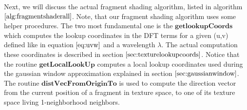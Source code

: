 \label{sec:proceduresdescripton}
Next, we will discuss the actual fragment shading algorithm, listed in algorithm $\ref{alg:fragmentshaderall}$. Note, that our fragment shading algorithm uses some helper procedures. The two most fundamental one is the $\textbf{getlookupCoords}$ which computes the lookup coordinates in the DFT terms for a given (u,v) defined like in equation $\ref{eq:uvw}$ and a wavelength $\lambda$. The actual computation these coordinates is described in section $\ref{sec:texturelookupcoords}$. Notice that the routine $\textbf{getLocalLookUp}$ computes a local lookup coordinates used during the gaussian window approximation explained in section $\ref{sec:gaussianwindow}$. The routine $\textbf{distVecFromOriginTo}$ is used to compute the direction vector from the current position of a fragment in texture space, to one of its texture space living 1-neighborhood neighbors.

